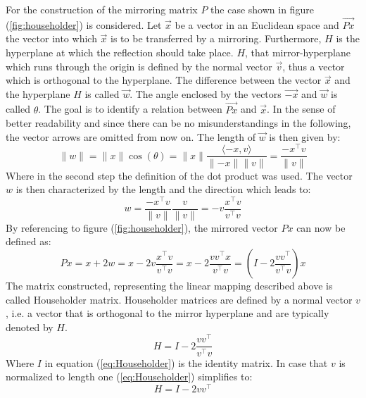 For the construction of the mirroring matrix $P$ the case shown in figure (\ref{fig:householder}) is considered. Let $\vec{x}$ be a vector in an Euclidean space and $\vec{Px}$ the vector into which $\vec{x}$ is to be transferred by a mirroring. Furthermore, $H$ is the hyperplane at which the reflection should take place. $H$, that mirror-hyperplane which runs through the origin is defined by the normal vector $\vec{v}$, thus a vector which is orthogonal to the hyperplane. The difference between the vector $\vec{x}$ and the hyperplane $H$ is called $\vec{w}$. The angle enclosed by the vectors $\vec{-x}$ and $\vec{w}$ is called $\theta$. The goal is to identify a relation between $\vec{Px}$ and $\vec{x}$. In the sense of better readability and since there can be no misunderstandings in the following, the vector arrows are omitted from now on. The length of $\vec{w}$ is then given by: 
\begin{equation*}
	\lVert w \rVert 
	= \lVert x \rVert \cos(\theta) 
	= \lVert x \rVert \frac{\langle -x, v \rangle}{\lVert -x \rVert  \lVert v \rVert} 
	= \frac{-x^\top v}{\lVert v \rVert}
\end{equation*}
Where in the second step the definition of the dot product was used. The vector $w$ is then characterized by the length and the direction which leads to: 
\begin{equation*}
	w  
	= \frac{-x^\top v}{\lVert v \rVert} \frac{v}{\lVert v \rVert}
	= -v \frac{x^\top v}{v^\top v}
\end{equation*}
By referencing to figure (\ref{fig:householder}), the mirrored vector $Px$ can now be defined as:
\begin{equation*}
	Px   
	= x + 2w
	= x - 2v \frac{x^\top v}{v^\top v}
	= x - 2 \frac{v v^\top x}{v^\top v}
	= \left(I -  2 \frac{v v^\top}{v^\top v} \right)x
\end{equation*}
The matrix constructed, representing the linear mapping described above is called Householder matrix.  Householder matrices are  defined by a normal vector $v$, i.e. a vector that is orthogonal to the mirror hyperplane and are typically denoted by $H$.
\begin{equation}\label{eq:Householder}
H = I - 2 \frac{v v^\top}{v^\top v}
\end{equation}
Where $I$ in equation (\ref{eq:Householder}) is the identity matrix. In case that $v$ is normalized to length one (\ref{eq:Householder}) simplifies to:
\begin{equation}
H = I - 2 v v^\top
\end{equation}
